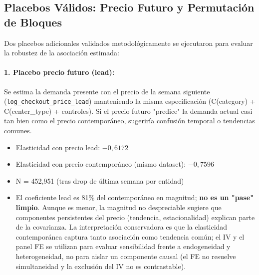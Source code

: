\documentclass[doc, a4paper, biblatex, floatsintext, longtable, babel]{apa7}
\begin{document}
\subsection{Placebos Válidos: Precio Futuro y Permutación de Bloques}
\label{subsec:placebos_validos}

Dos placebos adicionales validados metodológicamente se ejecutaron para evaluar la robustez de la asociación estimada:

\paragraph{1. Placebo precio futuro (lead):} Se estima la demanda presente con el precio de la semana siguiente (\texttt{log\_checkout\_price\_lead}) manteniendo la misma especificación (C(category) + C(center\_type) + controles). Si el precio futuro "predice" la demanda actual casi tan bien como el precio contemporáneo, sugeriría confusión temporal o tendencias comunes.
\begin{itemize}
    \item Elasticidad con precio lead: $-0,6172$
    \item Elasticidad con precio contemporáneo (mismo dataset): $-0,7596$
    \item N = 452,951 (tras drop de última semana por entidad)
    \item El coeficiente lead es 81\% del contemporáneo en magnitud; \textbf{no es un "pase" limpio}. Aunque es menor, la magnitud no despreciable sugiere que componentes persistentes del precio (tendencia, estacionalidad) explican parte de la covarianza. La interpretación conservadora es que la elasticidad contemporánea captura tanto asociación como tendencia común; el IV y el panel FE se utilizan para evaluar sensibilidad frente a endogeneidad y heterogeneidad, no para aislar un componente causal (el FE no resuelve simultaneidad y la exclusión del IV no es contrastable).
\end{itemize}
\end{document}
